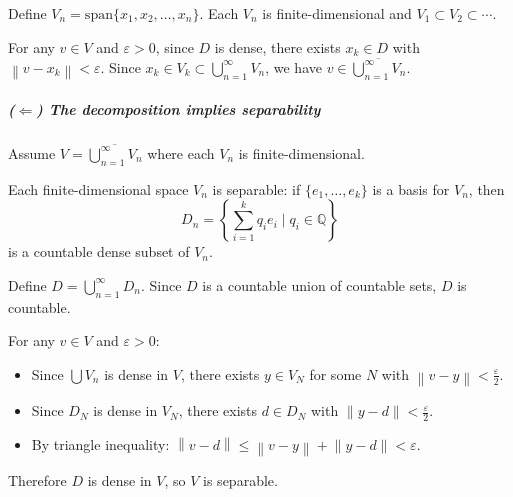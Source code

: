 \documentclass{ctexart}
\begin{document}
Define \(V_n = \text{span}\{x_1, x_2, \ldots, x_n\}\). Each \(V_n\)
is finite-dimensional and \(V_1 \subset V_2 \subset \cdots\).

For any \(v \in V\) and \(\varepsilon > 0\), since \(D\) is dense,
there exists \(x_k \in D\) with \(\left\| v - x_k \right\| <
\varepsilon\). Since \(x_k \in V_k \subset \bigcup_{n=1}^{\infty}
V_n\), we have \(v \in \overline{\bigcup_{n=1}^{\infty} V_n}\).

\subparagraph{(\(\Leftarrow\)) The decomposition implies separability}

Assume \(V = \overline{\bigcup_{n=1}^{\infty} V_n}\) where each
\(V_n\) is finite-dimensional.

Each finite-dimensional space \(V_n\) is separable: if \(\{e_1,
\ldots, e_k\}\) is a basis for \(V_n\), then
\[
    D_n = \left\{ \sum_{i=1}^{k} q_i e_i \mid q_i \in \mathbb{Q} \right\}
\]
is a countable dense subset of \(V_n\).

Define \(D = \bigcup_{n=1}^{\infty} D_n\). Since \(D\) is a countable
union of countable sets, \(D\) is countable.

For any \(v \in V\) and \(\varepsilon > 0\):
\begin{itemize}
    \item Since \(\bigcup V_n\) is dense in \(V\), there exists \(y
        \in V_N\) for some \(N\) with \(\left\| v - y \right\| <
        \frac{\varepsilon}{2}\).
    \item Since \(D_N\) is dense in \(V_N\), there exists \(d \in
        D_N\) with \(\left\| y - d \right\| < \frac{\varepsilon}{2}\).
    \item By triangle inequality: \(\left\| v - d \right\| \leq
        \left\| v - y \right\| + \left\| y - d \right\| < \varepsilon\).
\end{itemize}

Therefore \(D\) is dense in \(V\), so \(V\) is separable.
\end{document}
